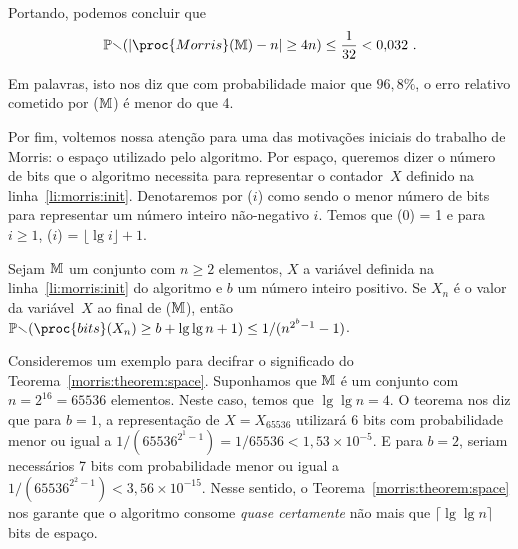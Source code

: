 Portando, podemos concluir que 
\begin{align}
  \Pbb(|\proc{Morris}(\Mbb) - n| \geq 4n) \leq \frac{1}{32} < 0{,}032 \ .  \label{morris:error:result}
\end{align}

Em palavras, isto nos diz que com probabilidade maior que $96{,}8\%$, o erro relativo cometido por ($\mathbb{M}$) 
é menor do que 4.

Por fim, voltemos nossa atenção para uma das motivações iniciais do trabalho de Morris: o espaço utilizado pelo 
algoritmo. Por espaço, queremos dizer o número de bits que o algoritmo  necessita para representar o 
contador~$X$ definido na linha~\ref{li:morris:init}. Denotaremos por ($i$) como sendo o menor número de bits
para representar um número inteiro não-negativo $i$. Temos que (0) = 1 e para $i \geq 1$, ($i$) = 
$\lfloor\lg i\rfloor + 1$.

\begin{theorem}
  \label{morris:theorem:space}
  Sejam $\mathbb{M}$ um conjunto com $n \geq 2$ elementos, $X$ a variável definida na linha~\ref{li:morris:init} do algoritmo
   e $b$ um número inteiro positivo. Se $X_n$ é o valor da variável~$X$ ao final de ($\mathbb{M}$), 
  então $\Pbb(\proc{bits}(X_n) \geq b + \lg\lg n + 1) \leq 1/(n^{2^b-1}-1)$.
\end{theorem}

Consideremos um exemplo para decifrar o significado do Teorema~\ref{morris:theorem:space}. Suponhamos que $\mathbb{M}$ é um 
conjunto com $n = 2^{16} = 65536$ elementos. Neste caso, temos que $\lg \lg n = 4$. O teorema nos diz que para $b = 1$,
a representação de $X = X_{65536}$ utilizará 6 bits com probabilidade menor ou igual a 
$1/(65536^{2^1 - 1}) = 1/65536 < 1{,}53 \times 10^{-5}$. E para $b = 2$, seriam necessários 7 bits com probabilidade 
menor ou igual a $1/(65536^{2^2 - 1}) < 3{,}56 \times 10^{-15}$. Nesse sentido, o Teorema~\ref{morris:theorem:space} nos 
garante que o algoritmo  consome \textit{quase certamente} não mais que $\lceil\lg \lg n\rceil$ bits de 
espaço.


